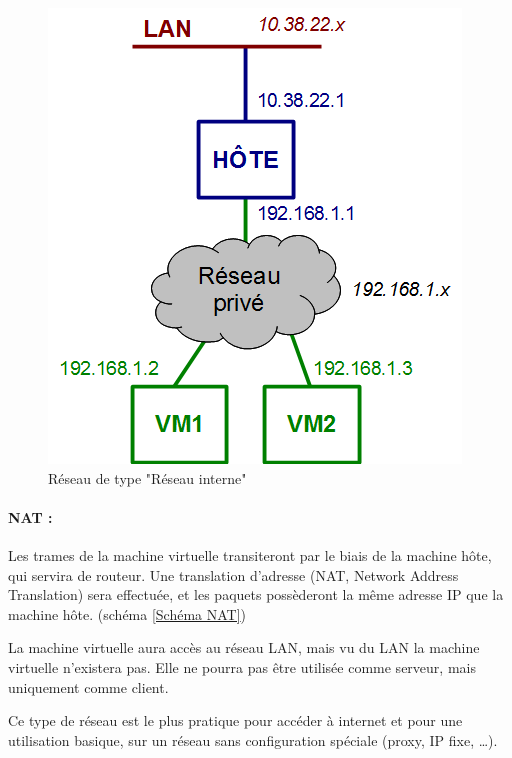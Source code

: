 \begin{figure}[H]
	\center
	\includegraphics[scale=0.5]{images/types_reseau/Reseau_interne.png}
	\caption{Réseau de type "Réseau interne"}
	\label{Schéma Réseau interne}
\end{figure}


\paragraph{NAT :}

Les trames de la machine virtuelle transiteront par le biais de la machine hôte, qui servira de routeur.
Une translation d'adresse (NAT, Network Address Translation) sera effectuée, et les paquets possèderont la même adresse IP que la machine hôte. (schéma \ref{Schéma NAT})

La machine virtuelle aura accès au réseau LAN, mais vu du LAN la machine virtuelle n'existera pas.
Elle ne pourra pas être utilisée comme serveur, mais uniquement comme client.

Ce type de réseau est le plus pratique pour accéder à internet et pour une utilisation basique, sur un réseau sans configuration spéciale (proxy, IP fixe, \ldots).

